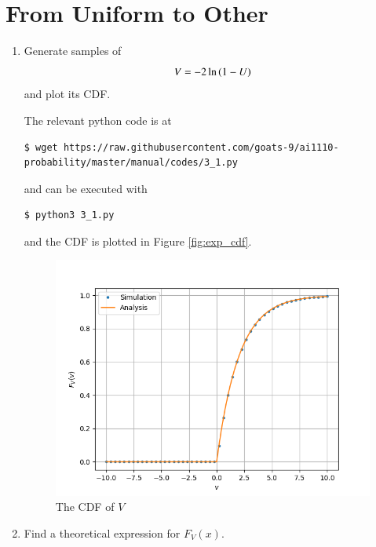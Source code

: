 \documentclass[journal,12pt,twocolumn]{IEEEtran}
\renewcommand\thesection{\arabic{section}}
\begin{document}
\section{From Uniform to Other}
\begin{enumerate}[label=\thesection.\arabic*
,ref=\thesection.\theenumi]
%
\item
Generate samples of 
%
\begin{equation}
V = -2\ln\left(1-U\right)
\end{equation}
%
and plot its CDF. 

\solution
The relevant python code is at
\begin{lstlisting}
$ wget https://raw.githubusercontent.com/goats-9/ai1110-probability/master/manual/codes/3_1.py
\end{lstlisting}
and can be executed with
\begin{lstlisting}
$ python3 3_1.py
\end{lstlisting}

and the CDF is plotted in Figure \eqref{fig:exp_cdf}.
\begin{figure}
\centering
\includegraphics[width=\columnwidth]{./figs/3_1.png}
\caption{The CDF of $V$}
\label{fig:exp_cdf}
\end{figure}

\item Find a theoretical expression for $F_V(x)$.


\end{enumerate}
\end{document}
